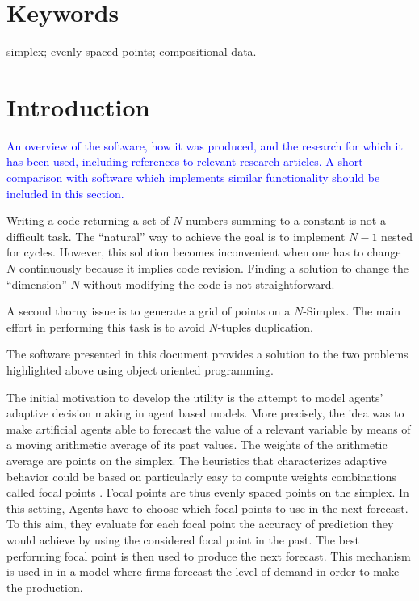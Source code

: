 \documentclass{jors}
\begin{document}
\section*{Keywords}

simplex; evenly spaced points; compositional data.

\section*{Introduction}

\textcolor{blue}{An overview of the software, how it was produced, and the research for which it has been used, including references to relevant research articles. A short comparison with software which implements similar functionality should be included in this section. }

Writing a code returning a set of $N$ numbers summing to a constant is not a difficult task. The ``natural'' way to achieve the goal is to implement $N-1$ nested for cycles. However, this solution becomes inconvenient when one has to change $N$ continuously because it implies code revision. Finding a solution to change the ``dimension'' $N$ without modifying the code is not straightforward. 

A second thorny issue is to generate a grid of points on a $N$-Simplex. The main effort in performing this task is to avoid $N$-tuples duplication.

The software presented in this document provides a solution to the two problems highlighted above using object oriented programming.     

The initial motivation to develop the utility is the attempt to model agents' adaptive decision making in agent based models. More precisely, the idea was to make artificial agents able to forecast the value of a relevant variable by means of a moving arithmetic average of its past values. The weights of the arithmetic average are points on the simplex. The heuristics that characterizes adaptive behavior \cite{gigerenzeretal11} could be based on particularly easy to compute weights combinations called focal points \cite{schelling60}. Focal points are thus evenly spaced points on the simplex. In this setting, Agents have to choose which focal points to use in the next forecast. To this aim, they evaluate for each focal point the accuracy of prediction they would achieve by using the considered focal point in the past. The best performing focal point is then used to produce the next forecast. 
This mechanism is used in \cite{icaart12} in a model where firms forecast the level of demand in order to make the production. 
\end{document}

